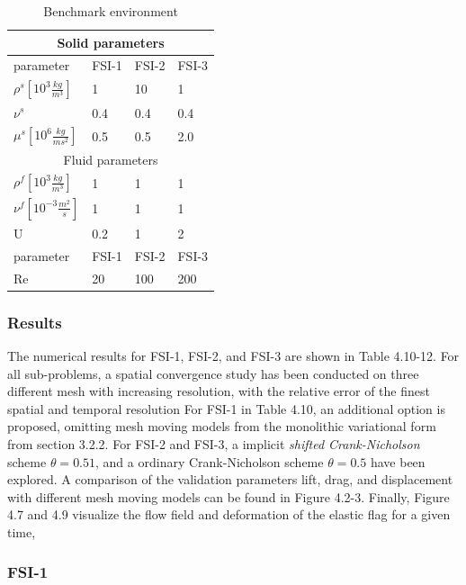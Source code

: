 \begin{table}[h!]
\centering
\caption{Benchmark environment}
\label{my-label}
\begin{tabular}{ |p{3cm}||p{2cm}|p{2cm}|p{2cm}|  }
 \hline
 \multicolumn{4}{|c|}{Solid parameters} \\
 \hline
 parameter              & FSI-1 & FSI-2 & FSI-3 \\
 \hline
 $\rho^s [10^{3} \frac{kg}{m^3}]$ & 1    & 10   & 1    \\
$\nu^s$ & 0.4  & 0.4  & 0.4  \\
$\mu^s  [10^{6}\frac{kg}{ms^2}]$  & 0.5  & 0.5  & 2.0  \\
 \hline
 \multicolumn{4}{|c|}{Fluid parameters} \\
 \hline
$\rho^f [10^{3}\frac{kg}{m^3}]$ & 1    & 1    & 1    \\
$\nu^f  [10^{-3}\frac{m^2}{s}]$  & 1    & 1    & 1    \\
U                      & 0.2  & 1    & 2    \\
parameter              & FSI-1 & FSI-2 & FSI-3 \\
Re                     & 20   & 100  & 200 \\
\hline
\end{tabular}
\end{table}

\subsubsection*{Results}
The numerical results for FSI-1, FSI-2, and FSI-3  are shown in Table 4.10-12. For all sub-problems, a spatial convergence study has been conducted on three different mesh with increasing resolution, with the relative error of the finest spatial and temporal resolution For FSI-1 in Table 4.10, an additional option is proposed, omitting mesh moving models from the monolithic variational form from section 3.2.2. For FSI-2 and FSI-3, a implicit \textit{shifted Crank-Nicholson} scheme $\theta = 0.51$, and a ordinary Crank-Nicholson scheme $\theta = 0.5$ have been explored. A comparison of the validation parameters lift, drag, and displacement with different mesh moving models can be found in Figure 4.2-3. Finally, Figure 4.7 and 4.9 visualize the flow field and deformation of the elastic flag for a given time,
 
 \newpage
\subsubsection{FSI-1}

